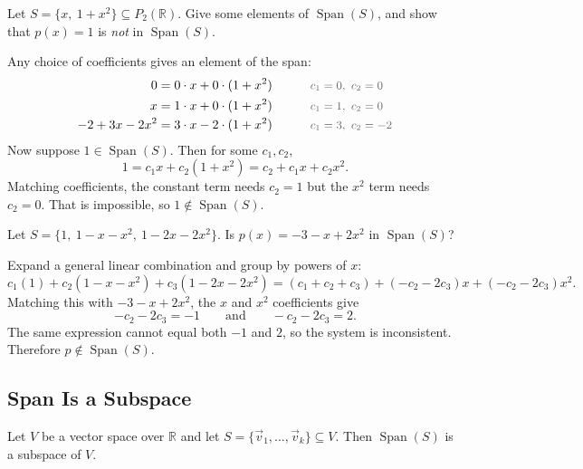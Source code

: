 \begin{example}
Let $S = \{x, \ 1 + x^2\} \subseteq P_2(\mathbb{R})$. Give some elements of $\operatorname{Span}(S)$, and show that $p(x) = 1$ is \emph{not} in $\operatorname{Span}(S)$.

\begin{solution}
Any choice of coefficients gives an element of the span:
\begin{alignat*}{2}
0 &= 0 \cdot x + 0 \cdot (1 + x^2) &\qquad& \by{$c_1 = 0,\ c_2 = 0$} \\
x &= 1 \cdot x + 0 \cdot (1 + x^2) && \by{$c_1 = 1,\ c_2 = 0$} \\
-2 + 3x - 2x^2 &= 3 \cdot x - 2 \cdot (1 + x^2) && \by{$c_1 = 3,\ c_2 = -2$}
\end{alignat*}
Now suppose $1 \in \operatorname{Span}(S)$. Then for some $c_1, c_2$,
\[
1 = c_1 x + c_2(1 + x^2) = c_2 + c_1 x + c_2 x^2.
\]
Matching coefficients, the constant term needs $c_2 = 1$ but the $x^2$ term needs $c_2 = 0$. That is impossible, so $1 \notin \operatorname{Span}(S)$.
\end{solution}
\end{example}

\begin{example}
Let $S = \{1, \ 1 - x - x^2, \ 1 - 2x - 2x^2\}$. Is $p(x) = -3 - x + 2x^2$ in $\operatorname{Span}(S)$?

\begin{solution}
Expand a general linear combination and group by powers of $x$:
\[
c_1(1) + c_2(1 - x - x^2) + c_3(1 - 2x - 2x^2) = (c_1 + c_2 + c_3) + (-c_2 - 2c_3)x + (-c_2 - 2c_3)x^2.
\]
Matching this with $-3 - x + 2x^2$, the $x$ and $x^2$ coefficients give
\[
-c_2 - 2c_3 = -1 \qquad \text{and} \qquad -c_2 - 2c_3 = 2.
\]
The same expression cannot equal both $-1$ and $2$, so the system is inconsistent. Therefore $p \notin \operatorname{Span}(S)$.
\end{solution}
\end{example}

\subsection{Span Is a Subspace}

\begin{theorem}\label{thm:L2-span-subspace}
Let $V$ be a vector space over $\mathbb{R}$ and let $S = \{\vec{v}_1, \dots, \vec{v}_k\} \subseteq V$. Then $\operatorname{Span}(S)$ is a subspace of $V$.
\end{theorem}

